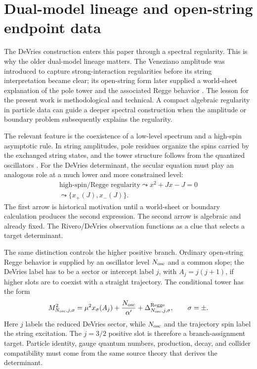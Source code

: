 \section{Dual-model lineage and open-string endpoint data}
\label{sec:dual-model-lineage}

The DeVries construction enters this paper through a spectral regularity.  This is why the older dual-model lineage matters.  The Veneziano amplitude was introduced to capture strong-interaction regularities before its string interpretation became clear; its open-string form later supplied a world-sheet explanation of the pole tower and the associated Regge behavior \cite{TongString}.  The lesson for the present work is methodological and technical.  A compact algebraic regularity in particle data can guide a deeper spectral construction when the amplitude or boundary problem subsequently explains the regularity.

The relevant feature is the coexistence of a low-level spectrum and a high-spin asymptotic rule.  In string amplitudes, pole residues organize the spins carried by the exchanged string states, and the tower structure follows from the quantized oscillators \cite{TongString}.  For the DeVries determinant, the secular equation must play an analogous role at a much lower and more constrained level:
\begin{equation}
  \begin{gathered}
  \text{high-spin/Regge regularity}
  \leadsto x^2+Jx-J=0\\
  \leadsto
  \{x_+(J),x_-(J)\}.
  \end{gathered}
  \label{eq:regge-to-secular}
\end{equation}
The first arrow is historical motivation until a world-sheet or boundary calculation produces the second expression.  The second arrow is algebraic and already fixed.  The Rivero/DeVries observation functions as a clue that selects a target determinant.

The same distinction controls the higher positive branch.  Ordinary open-string
Regge behavior is supplied by an oscillator level \(N_{\rm osc}\) and a common
slope; the DeVries label has to be a sector or intercept label \(j\), with
\(A_j=j(j+1)\), if higher slots are to coexist with a straight trajectory.  The
conditional tower has the form
\begin{equation}
  M^2_{N_{\rm osc},j,\sigma}
  =
  \mu^2 x_\sigma(A_j)+\frac{N_{\rm osc}}{\alpha'}
  +\Delta^{\rm Regge}_{N_{\rm osc},j,\sigma},
  \qquad \sigma=\pm .
  \label{eq:regge-intercept-extension}
\end{equation}
Here \(j\) labels the reduced DeVries sector, while \(N_{\rm osc}\) and the
trajectory spin label the string excitation.  The \(j=3/2\) positive slot is
therefore a branch-assignment target.  Particle identity, gauge quantum
numbers, production, decay, and collider compatibility must come from the same
source theory that derives the determinant.

